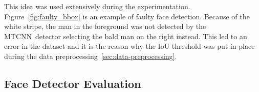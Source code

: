 This idea was used extensively during the experimentation.
Figure~\ref{fig:faulty_bbox} is an example of faulty face detection.
Because of the white stripe, the man in the foreground was not detected by the MTCNN detector selecting the bald man
on the right instead.
This led to an error in the dataset and it is the reason why the IoU threshold was put in place during the data
preprocessing~\ref{sec:data-preprocessing}.

\subsection{Face Detector Evaluation}\label{subsec:detectorevaluation}